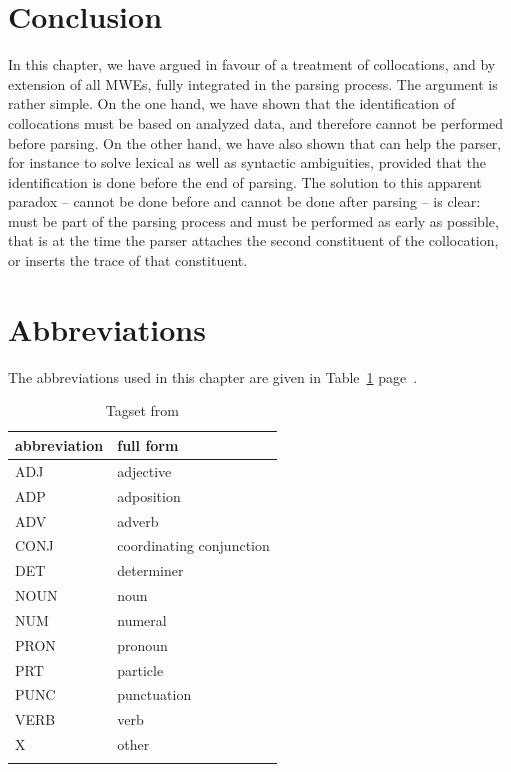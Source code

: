 \documentclass[output=paper]{langsci/langscibook}
\begin{document}
\section{Conclusion}
\label{fou:sec7}
In this chapter, we have argued in favour of a treatment of collocations, and by extension of all MWEs, fully integrated in the parsing process. The argument is rather simple. On the one hand, we have shown that the identification of collocations must be based on analyzed data, and therefore cannot be performed before parsing. On the other hand, we have also shown that  can help the parser, for instance to solve lexical as well as syntactic ambiguities, provided that the identification is done before the end of parsing. The solution to this apparent paradox --  cannot be done before and cannot be done after parsing -- is clear:  must be part of the parsing process and must be performed as early as possible, that is at the time the parser attaches the second constituent of the collocation, or inserts the trace of that constituent. 

%
% 

\section*{Abbreviations}

The abbreviations used in this chapter are given in Table~\ref{fou:abbr} page~\pageref{fou:abbr}.

\begin{table}[h!]
  \begin{tabular}{ll}
    \lsptoprule
    abbreviation & full form \\
    \midrule
    ADJ & adjective \\
    ADP & adposition \\
    ADV & adverb \\
    CONJ & coordinating conjunction \\
    DET & determiner \\
    NOUN & noun \\
    NUM & numeral \\
    PRON & pronoun \\
    PRT & particle     \\
    PUNC & punctuation \\
    VERB & verb \\
    X & other \tabularnewline
    \lspbottomrule
  \end{tabular}
  \caption{\label{fou:abbr}Tagset from \cite{petrov12}}
\end{table}



\printbibliography[heading=subbibliography,notkeyword=this]

\end{document}
